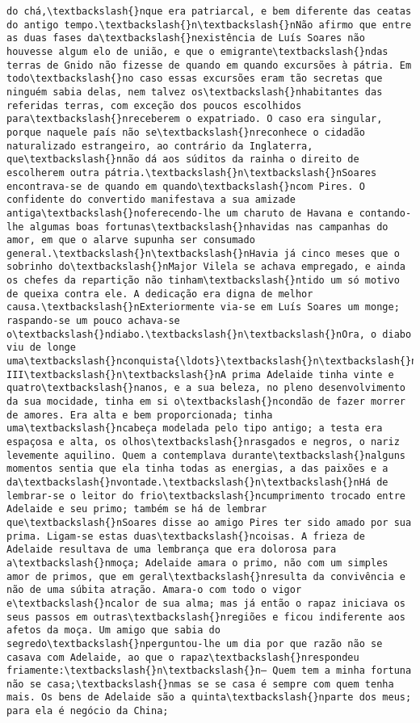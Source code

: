 \documentclass[11pt]{article}
\begin{document}
\begin{Verbatim}[commandchars=\\\{\}]
do chá,\textbackslash{}nque era patriarcal, e bem diferente das ceatas do antigo tempo.\textbackslash{}n\textbackslash{}nNão afirmo que entre as duas fases da\textbackslash{}nexistência de Luís Soares não houvesse algum elo de união, e que o emigrante\textbackslash{}ndas terras de Gnido não fizesse de quando em quando excursões à pátria. Em todo\textbackslash{}no caso essas excursões eram tão secretas que ninguém sabia delas, nem talvez os\textbackslash{}nhabitantes das referidas terras, com exceção dos poucos escolhidos para\textbackslash{}nreceberem o expatriado. O caso era singular, porque naquele país não se\textbackslash{}nreconhece o cidadão naturalizado estrangeiro, ao contrário da Inglaterra, que\textbackslash{}nnão dá aos súditos da rainha o direito de escolherem outra pátria.\textbackslash{}n\textbackslash{}nSoares encontrava-se de quando em quando\textbackslash{}ncom Pires. O confidente do convertido manifestava a sua amizade antiga\textbackslash{}noferecendo-lhe um charuto de Havana e contando-lhe algumas boas fortunas\textbackslash{}nhavidas nas campanhas do amor, em que o alarve supunha ser consumado general.\textbackslash{}n\textbackslash{}nHavia já cinco meses que o sobrinho do\textbackslash{}nMajor Vilela se achava empregado, e ainda os chefes da repartição não tinham\textbackslash{}ntido um só motivo de queixa contra ele. A dedicação era digna de melhor causa.\textbackslash{}nExteriormente via-se em Luís Soares um monge; raspando-se um pouco achava-se o\textbackslash{}ndiabo.\textbackslash{}n\textbackslash{}nOra, o diabo viu de longe uma\textbackslash{}nconquista{\ldots}\textbackslash{}n\textbackslash{}nCAPÍTULO III\textbackslash{}n\textbackslash{}nA prima Adelaide tinha vinte e quatro\textbackslash{}nanos, e a sua beleza, no pleno desenvolvimento da sua mocidade, tinha em si o\textbackslash{}ncondão de fazer morrer de amores. Era alta e bem proporcionada; tinha uma\textbackslash{}ncabeça modelada pelo tipo antigo; a testa era espaçosa e alta, os olhos\textbackslash{}nrasgados e negros, o nariz levemente aquilino. Quem a contemplava durante\textbackslash{}nalguns momentos sentia que ela tinha todas as energias, a das paixões e a da\textbackslash{}nvontade.\textbackslash{}n\textbackslash{}nHá de lembrar-se o leitor do frio\textbackslash{}ncumprimento trocado entre Adelaide e seu primo; também se há de lembrar que\textbackslash{}nSoares disse ao amigo Pires ter sido amado por sua prima. Ligam-se estas duas\textbackslash{}ncoisas. A frieza de Adelaide resultava de uma lembrança que era dolorosa para a\textbackslash{}nmoça; Adelaide amara o primo, não com um simples amor de primos, que em geral\textbackslash{}nresulta da convivência e não de uma súbita atração. Amara-o com todo o vigor e\textbackslash{}ncalor de sua alma; mas já então o rapaz iniciava os seus passos em outras\textbackslash{}nregiões e ficou indiferente aos afetos da moça. Um amigo que sabia do segredo\textbackslash{}nperguntou-lhe um dia por que razão não se casava com Adelaide, ao que o rapaz\textbackslash{}nrespondeu friamente:\textbackslash{}n\textbackslash{}n— Quem tem a minha fortuna não se casa;\textbackslash{}nmas se se casa é sempre com quem tenha mais. Os bens de Adelaide são a quinta\textbackslash{}nparte dos meus; para ela é negócio da China; 
\end{Verbatim}
\end{document}
